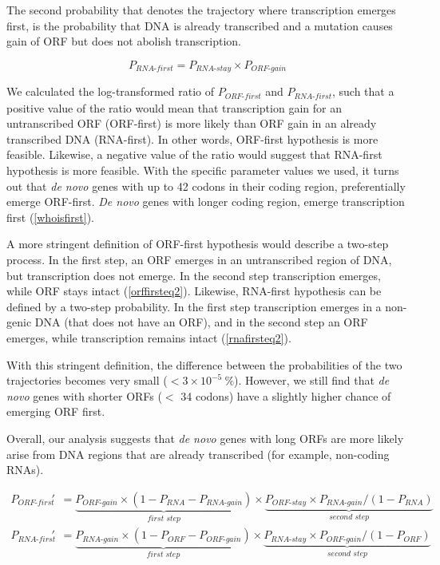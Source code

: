 \documentclass[12pt,a4paper]{article}
\begin{document}
The second probability that denotes the trajectory where transcription emerges first, is the probability that DNA is already transcribed and a mutation causes gain of ORF but does not abolish transcription. 

\begin{equation}
P_\textit{RNA-first} = P_\textit{RNA-stay}\times P_\textit{ORF-gain}
\label{rnafirsteq1}
\end{equation}

We calculated the log-transformed ratio of $P_\textit{ORF-first}$ and $P_\textit{RNA-first}$, such that a positive value of the ratio would mean that transcription gain for an untranscribed ORF (ORF-first) is more likely than ORF gain in an already transcribed DNA (RNA-first). In other words, ORF-first hypothesis is more feasible. Likewise, a negative value of the ratio would suggest that RNA-first hypothesis is more feasible. With the specific parameter values we used, it turns out that \textit{de novo} genes with up to 42 codons in their coding region, preferentially emerge ORF-first. \textit{De novo} genes with longer coding region, emerge transcription first (\autoref{whoisfirst}).

A more stringent definition of ORF-first hypothesis would describe a two-step process. In the first step, an ORF emerges in an untranscribed region of DNA, but transcription does not emerge. In the second step transcription emerges, while ORF stays intact (\autoref{orffirsteq2}). Likewise, RNA-first hypothesis can be defined by a two-step probability. In the first step transcription emerges in a non-genic DNA (that does not have an ORF), and in the second step an ORF emerges, while transcription remains intact (\autoref{rnafirsteq2}).

With this stringent definition, the difference between the probabilities of the two trajectories becomes very small ($< 3\times10^{-5}\ \%$). However, we still find that \textit{de novo} genes with shorter ORFs ($<$ 34 codons) have a slightly higher chance of emerging ORF first.

Overall, our analysis suggests that \textit{de novo} genes with long ORFs are more likely arise from DNA regions that are already transcribed (for example, non-coding RNAs). 

\begin{align}
P_\textit{ORF-first}' & = \underbrace{P_\textit{ORF-gain} \times (1-P_\textit{RNA} -P_\textit{RNA-gain})}_\textit{first step} \times \underbrace{P_\textit{ORF-stay}\times P_\textit{RNA-gain}/(1-P_\textit{RNA})}_\textit{second step} \label{orffirsteq2}\\[1em]
P_\textit{RNA-first}' & = \underbrace{P_\textit{RNA-gain} \times (1-P_\textit{ORF} -P_\textit{ORF-gain})}_\textit{first step} \times \underbrace{P_\textit{RNA-stay}\times P_\textit{ORF-gain}/(1-P_\textit{ORF})}_\textit{second step}\label{rnafirsteq2}
\end{align}
\end{document}
